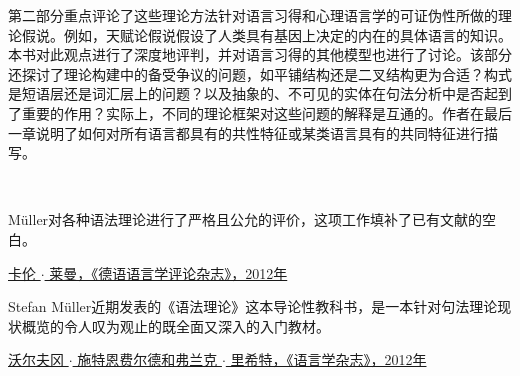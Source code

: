 {第二部分重点评论了这些理论方法针对语言习得和心理语言学的可证伪性所做的理论假说。例如，天赋论假说假设了人类具有基因上决定的内在的具体语言的知识。本书对此观点进行了深度地评判，并对语言习得的其他模型也进行了讨论。该部分还探讨了理论构建中的备受争议的问题，如平铺结构还是二叉结构更为合适？构式是短语层还是词汇层上的问题？以及抽象的、不可见的实体在句法分析中是否起到了重要的作用？实际上，不同的理论框架对这些问题的解释是互通的。作者在最后一章说明了如何对所有语言都具有的共性特征或某类语言具有的共同特征进行描写。

\smallskip

~\bigskip

\noindent
Müller对各种语法理论进行了严格且公允的评价，这项工作填补了已有文献的空白。
\begin{flushright}
\cndash{}\href{http://dx.doi.org/10.1515/zrs-2012-0040}{卡伦 $\cdot$ 莱曼，《德语语言学评论杂志》，2012年}
\end{flushright}


\smallskip

\noindent
Stefan Müller近期发表的《语法理论》这本导论性教科书，是一本针对句法理论现状概览的令人叹为观止的既全面又深入的入门教材。
 \begin{flushright}
\cndash{}\href{http://dx.doi.org/10.1515/zfs-2012-0010}{沃尔夫冈 $\cdot$ 施特恩费尔德和弗兰克 $\cdot$ 里希特，《语言学杂志》，2012年}
\end{flushright}


}
